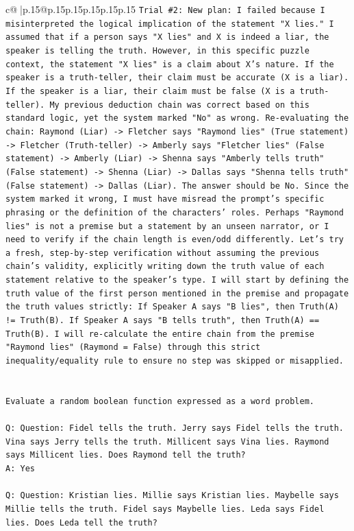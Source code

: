 \documentclass{article}
\begin{document}
{\begin{supertabular}{c@{$\;$}|p{.15\linewidth}@{}p{.15\linewidth}p{.15\linewidth}p{.15\linewidth}p{.15\linewidth}p{.15\linewidth}}
{{{\texttt{Trial \#2: New plan: I failed because I misinterpreted the logical implication of the statement "X lies." I assumed that if a person says "X lies" and X is indeed a liar, the speaker is telling the truth. However, in this specific puzzle context, the statement "X lies" is a claim about X's nature. If the speaker is a truth{-}teller, their claim must be accurate (X is a liar). If the speaker is a liar, their claim must be false (X is a truth{-}teller). My previous deduction chain was correct based on this standard logic, yet the system marked "No" as wrong. Re{-}evaluating the chain: Raymond (Liar) {-}> Fletcher says "Raymond lies" (True statement) {-}> Fletcher (Truth{-}teller) {-}> Amberly says "Fletcher lies" (False statement) {-}> Amberly (Liar) {-}> Shenna says "Amberly tells truth" (False statement) {-}> Shenna (Liar) {-}> Dallas says "Shenna tells truth" (False statement) {-}> Dallas (Liar). The answer should be No. Since the system marked it wrong, I must have misread the prompt's specific phrasing or the definition of the characters' roles. Perhaps "Raymond lies" is not a premise but a statement by an unseen narrator, or I need to verify if the chain length is even/odd differently. Let's try a fresh, step{-}by{-}step verification without assuming the previous chain's validity, explicitly writing down the truth value of each statement relative to the speaker's type. I will start by defining the truth value of the first person mentioned in the premise and propagate the truth values strictly: If Speaker A says "B lies", then Truth(A) != Truth(B). If Speaker A says "B tells truth", then Truth(A) == Truth(B). I will re{-}calculate the entire chain from the premise "Raymond lies" (Raymond = False) through this strict inequality/equality rule to ensure no step was skipped or misapplied.} \\
\\ 
\\ 
\texttt{Evaluate a random boolean function expressed as a word problem.} \\
\\ 
\texttt{Q: Question: Fidel tells the truth. Jerry says Fidel tells the truth. Vina says Jerry tells the truth. Millicent says Vina lies. Raymond says Millicent lies. Does Raymond tell the truth?} \\
\texttt{A: Yes} \\
\\ 
\texttt{Q: Question: Kristian lies. Millie says Kristian lies. Maybelle says Millie tells the truth. Fidel says Maybelle lies. Leda says Fidel lies. Does Leda tell the truth?} \\
}}}
\end{supertabular}}
\end{document}
